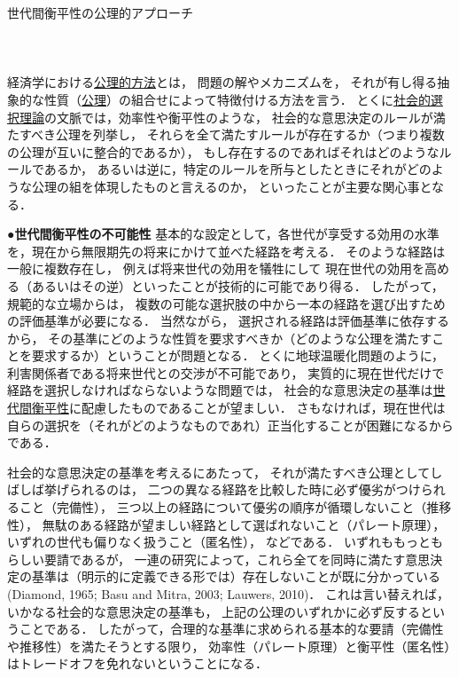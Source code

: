 \documentclass[11pt,a4paper]{article}
\begin{document}
\noindent
世代間衡平性の公理的アプローチ\\
\ \\
\ \\
\ \\

経済学における\underline{公理的方法}とは，
問題の解やメカニズムを，
それが有し得る抽象的な性質（\underline{公理}）の組合せによって特徴付ける方法を言う．
とくに\underline{社会的選択理論}の文脈では，効率性や衡平性のような，
社会的な意思決定のルールが満たすべき公理を列挙し，
それらを全て満たすルールが存在するか（つまり複数の公理が互いに整合的であるか），
もし存在するのであればそれはどのようなルールであるか，
あるいは逆に，特定のルールを所与としたときにそれがどのような公理の組を体現したものと言えるのか，
といったことが主要な関心事となる．

\noindent\textbf{●世代間衡平性の不可能性}\hspace{0.5em}
基本的な設定として，各世代が享受する効用の水準を，現在から無限期先の将来にかけて並べた経路を考える．
そのような経路は一般に複数存在し，
例えば将来世代の効用を犠牲にして
現在世代の効用を高める（あるいはその逆）といったことが技術的に可能であり得る．
したがって，規範的な立場からは，
複数の可能な選択肢の中から一本の経路を選び出すための評価基準が必要になる．
当然ながら，
選択される経路は評価基準に依存するから，
その基準にどのような性質を要求すべきか（どのような公理を満たすことを要求するか）ということが問題となる．
とくに地球温暖化問題のように，
利害関係者である将来世代との交渉が不可能であり，
実質的に現在世代だけで経路を選択しなければならないような問題では，
社会的な意思決定の基準は\underline{世代間衡平性}に配慮したものであることが望ましい．
さもなければ，現在世代は自らの選択を（それがどのようなものであれ）正当化することが困難になるからである．

社会的な意思決定の基準を考えるにあたって，
それが満たすべき公理としてしばしば挙げられるのは，
二つの異なる経路を比較した時に必ず優劣がつけられること（完備性），
三つ以上の経路について優劣の順序が循環しないこと（推移性），
無駄のある経路が望ましい経路として選ばれないこと（パレート原理），
いずれの世代も偏りなく扱うこと（匿名性），
などである．
いずれももっともらしい要請であるが，
一連の研究によって，これら全てを同時に満たす意思決定の基準は（明示的に定義できる形では）存在しないことが既に分かっている
(Diamond, 1965; Basu and Mitra, 2003; Lauwers, 2010)．
これは言い替えれば，
いかなる社会的な意思決定の基準も，
上記の公理のいずれかに必ず反するということである．
したがって，合理的な基準に求められる基本的な要請（完備性や推移性）を満たそうとする限り，
効率性（パレート原理）と衡平性（匿名性）はトレードオフを免れないということになる．
\end{document}
